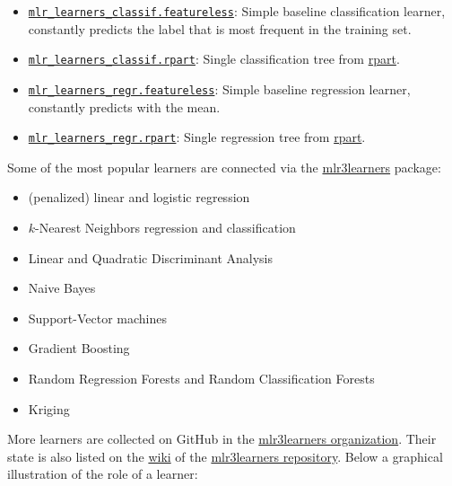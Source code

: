 \documentclass[]{scrbook}
\providecommand{\tightlist}{%
  \setlength{\itemsep}{0pt}\setlength{\parskip}{0pt}}
\begin{document}
\begin{itemize}
\tightlist
\item
  \href{https://mlr3.mlr-org.com/reference/mlr_learners_classif.featureless.html}{\texttt{mlr\_learners\_classif.featureless}}: Simple baseline classification learner, constantly predicts the label that is most frequent in the training set.
\item
  \href{https://mlr3.mlr-org.com/reference/mlr_learners_classif.rpart.html}{\texttt{mlr\_learners\_classif.rpart}}: Single classification tree from \href{https://cran.r-project.org/package=rpart}{rpart}.
\item
  \href{https://mlr3.mlr-org.com/reference/mlr_learners_regr.featureless.html}{\texttt{mlr\_learners\_regr.featureless}}: Simple baseline regression learner, constantly predicts with the mean.
\item
  \href{https://mlr3.mlr-org.com/reference/mlr_learners_regr.rpart.html}{\texttt{mlr\_learners\_regr.rpart}}: Single regression tree from \href{https://cran.r-project.org/package=rpart}{rpart}.
\end{itemize}

Some of the most popular learners are connected via the \href{https://mlr3learners.mlr-org.com}{mlr3learners} package:

\begin{itemize}
\tightlist
\item
  (penalized) linear and logistic regression
\item
  \(k\)-Nearest Neighbors regression and classification
\item
  Linear and Quadratic Discriminant Analysis
\item
  Naive Bayes
\item
  Support-Vector machines
\item
  Gradient Boosting
\item
  Random Regression Forests and Random Classification Forests
\item
  Kriging
\end{itemize}

More learners are collected on GitHub in the \href{https://github.com/mlr3learners/}{mlr3learners organization}.
Their state is also listed on the \href{https://github.com/mlr-org/mlr3learners/wiki}{wiki} of the \href{https://github.com/mlr-org/mlr3learners/}{mlr3learners repository}.
Below a graphical illustration of the role of a learner:
\end{document}
